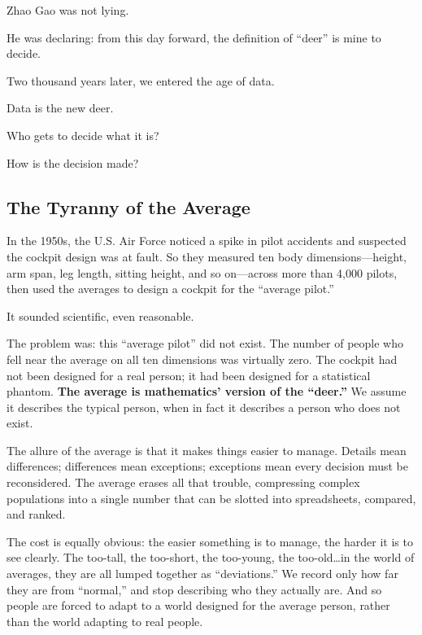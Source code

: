 Zhao Gao was not lying.

He was declaring: from this day forward, the definition of ``deer'' is mine to decide.

\vspace{1em}

Two thousand years later, we entered the age of data.

Data is the new deer.

\begin{thinkbox}[Reflection]
Who gets to decide what it is?

How is the decision made?
\end{thinkbox}


\newpage
\subsection{The Tyranny of the Average}

In the 1950s, the U.S. Air Force noticed a spike in pilot accidents and suspected the cockpit design was at fault.
So they measured ten body dimensions---height, arm span, leg length, sitting height, and so on---across more than 4,000 pilots, then used the averages to design a cockpit for the ``average pilot.''

It sounded scientific, even reasonable.

\vspace{1em}

The problem was: this ``average pilot'' did not exist.
The number of people who fell near the average on all ten dimensions was virtually zero. The cockpit had not been designed for a real person; it had been designed for a statistical phantom.
\textbf{The average is mathematics' version of the ``deer.''}
We assume it describes the typical person, when in fact it describes a person who does not exist.

\vspace{1em}

The allure of the average is that it makes things easier to manage. Details mean differences; differences mean exceptions; exceptions mean every decision must be reconsidered. The average erases all that trouble, compressing complex populations into a single number that can be slotted into spreadsheets, compared, and ranked.

\vspace{1em}

The cost is equally obvious: the easier something is to manage, the harder it is to see clearly.
The too-tall, the too-short, the too-young, the too-old\ldots in the world of averages, they are all lumped together as ``deviations.'' We record only how far they are from ``normal,'' and stop describing who they actually are.
And so people are forced to adapt to a world designed for the average person, rather than the world adapting to real people.

